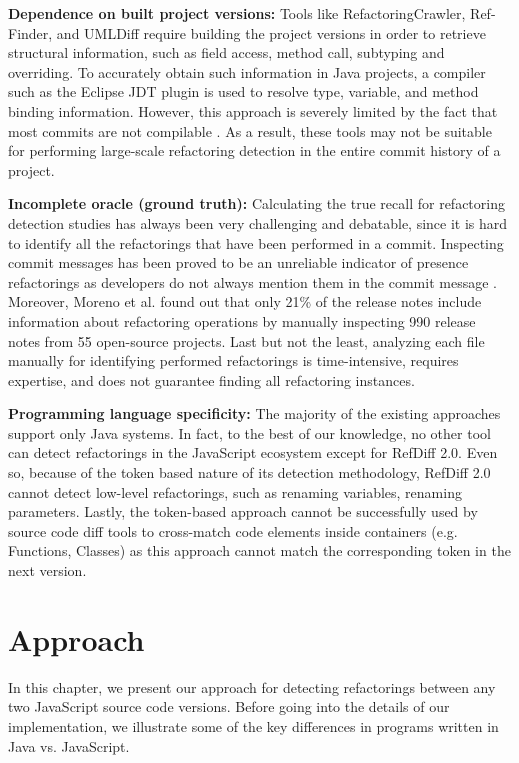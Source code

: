 \documentclass[letterpaper,12pt,onecolumn,final]{report}
\begin{document}
\textbf{Dependence on built project versions:} Tools like RefactoringCrawler, Ref-Finder, and UMLDiff require building the project versions in order to retrieve structural information, such as field access, method call, subtyping and overriding. To accurately obtain such information in Java projects, a compiler such as the Eclipse JDT plugin is used to resolve type, variable, and method binding information. However, this approach is severely limited by the fact that most commits are not compilable \cite{Tufano2017}. As a result, these tools may not be suitable for performing large-scale refactoring detection in the entire commit history of a project.

\textbf{Incomplete oracle (ground truth):} Calculating the true recall for refactoring detection studies has always been very challenging and debatable, since it is hard to identify all the refactorings that have been performed in a commit. Inspecting commit messages has been proved to be an unreliable indicator of presence refactorings as developers do not always mention them in the commit message \cite{MurphyHill2012}. Moreover, Moreno et al. \cite{laura2017arena} found out that only 21\% of the release notes include information about refactoring operations by manually inspecting 990 release notes from 55 open-source projects. Last but not the least, analyzing each file manually for identifying performed refactorings is time-intensive, requires expertise, and does not guarantee finding all refactoring instances. 

\textbf{Programming language specificity:} The majority of the existing approaches support only Java systems. In fact, to the best of our knowledge, no other tool can detect refactorings in the JavaScript ecosystem except for RefDiff 2.0. Even so, because of the token based nature of its detection methodology, RefDiff 2.0 cannot detect low-level refactorings, such as renaming variables, renaming parameters. Lastly, the token-based approach cannot be successfully used by source code diff tools to cross-match code elements inside containers (e.g. Functions, Classes) as this approach cannot match the corresponding token in the next version.

\chapter{Approach}

In this chapter, we present our approach for detecting refactorings between any two JavaScript source code versions. Before going into the details of our implementation, we illustrate some of the key differences in programs written in Java vs. JavaScript.
\end{document}
